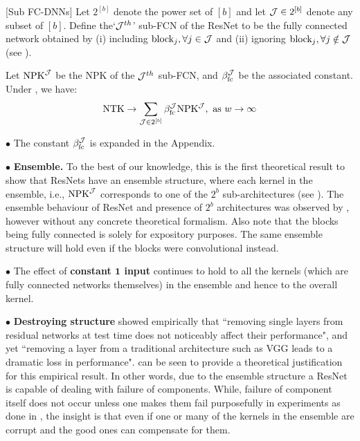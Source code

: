 \begin{definition}\label{def:subfcdnn}[Sub FC-DNNs]
Let $2^{[b]}$ denote the power set of $[b]$ and let $\mathcal{J}\in 2^{[b]}$ denote any subset of $[b]$. Define the`$\mathcal{J}^{th}$' sub-FCN of the ResNet to be the fully connected network obtained by (i) including  $\text{block}_{j},\forall j\in \mathcal{J}$  and (ii) ignoring $\text{block}_{j},\forall j\notin \mathcal{J}$ (see ).
\end{definition}
\begin{theorem}
\label{th:res} Let $\text{NPK}^{\mathcal{J}}$ be the NPK of the $\mathcal{J}^{th}$ sub-FCN, and $\beta_{\text{fc}}^{\mathcal{J}}$ be the associated constant. Under , we have:
\begin{align*}
\text{NTK}\rightarrow \sum_{\mathcal{J}\in 2^{[b]}}  \beta_{\text{fc}}^{\mathcal{J}} \text{NPK}^{\mathcal{J}}, \,\, \text{as}\,\,  w\rightarrow\infty
\end{align*}
\end{theorem}

$\bullet$ The constant $\beta_{\text{fc}}^{\mathcal{J}}$ is expanded in the Appendix. 

$\bullet$ \textbf{Ensemble.} To the best of our knowledge, this is the first theoretical result to show that ResNets have an ensemble structure, where  each kernel in the ensemble, i.e., $\text{NPK}^{\mathcal{J}}$ corresponds to one of the $2^b$ sub-architectures (see ). The ensemble behaviour of ResNet and  presence of $2^b$ architectures was observed by \cite{veit2016residual}, however without any concrete theoretical formalism. Also note that the blocks being fully connected is solely for expository purposes. The same ensemble structure will hold even if the blocks were convolutional instead.

$\bullet$ The effect of \textbf{constant $\mathbf{1}$ input} continues to hold to all the kernels (which are fully connected networks themselves) in the ensemble and hence to the overall kernel.

$\bullet$ \textbf{Destroying structure} \cite{veit2016residual} showed empirically that ``removing single layers from residual networks at test time does not noticeably affect their performance", and yet ``removing a layer from a traditional architecture such as VGG leads to a dramatic loss in performance".  can be seen to provide a theoretical justification for this empirical result. In other words, due to the ensemble structure a ResNet is capable of dealing with failure of components. While, failure of component itself does not occur unless one makes them fail purposefully in experiments as done in \citep{veit2016residual},  the insight is that even if one or many of the kernels in the ensemble are corrupt and the good ones can compensate for them. 

